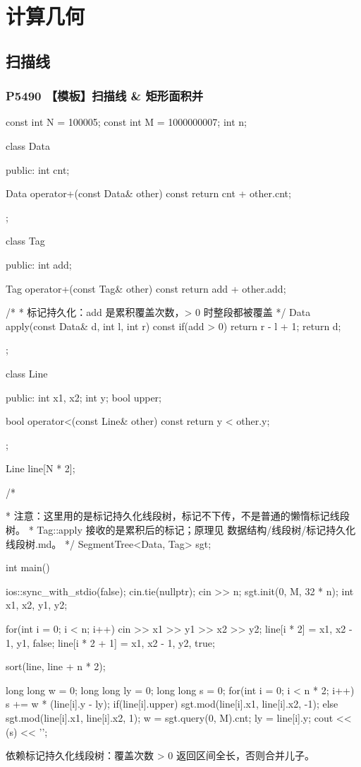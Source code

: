 \chapter{计算几何}

\section{扫描线}
\subsection{P5490 【模板】扫描线 \& 矩形面积并}\label{p5490-ux6a21ux677fux626bux63cfux7ebf-ux77e9ux5f62ux9762ux79efux5e76}


\begin{codeline}
const int N = 100005;
const int M = 1000000007;
int n;

class Data {
public:
    int cnt;

    Data operator+(const Data& other) const {
        return {cnt + other.cnt};
    }
};

class Tag {
public:
    int add;

    Tag operator+(const Tag& other) const {
        return {add + other.add};
    }

    /*
     * 标记持久化：add 是累积覆盖次数，> 0 时整段都被覆盖
     */
    Data apply(const Data& d, int l, int r) const {
        if(add > 0) {
            return {r - l + 1};
        }
        return d;
    }
};

class Line {
public:
    int x1, x2;
    int y;
    bool upper;

    bool operator<(const Line& other) const {
        return y < other.y;
    }
};

Line line[N * 2];

/*
\end{codeline}
\vspace{-0.9\baselineskip}
\begin{codeline}[firstnumber=47]
 * 注意：这里用的是标记持久化线段树，标记不下传，不是普通的懒惰标记线段树。
 * Tag::apply 接收的是累积后的标记；原理见 数据结构/线段树/标记持久化线段树.md。
 */
SegmentTree<Data, Tag> sgt;

int main() {
    ios::sync_with_stdio(false);
    cin.tie(nullptr);
    cin >> n;
    sgt.init(0, M, 32 * n);
    int x1, x2, y1, y2;

    for(int i = 0; i < n; i++) {
        cin >> x1 >> y1 >> x2 >> y2;
        line[i * 2] = {x1, x2 - 1, y1, false};
        line[i * 2 + 1] = {x1, x2 - 1, y2, true};
    }

    sort(line, line + n * 2);

    long long w = 0;
    long long ly = 0;
    long long s = 0;
    for(int i = 0; i < n * 2; i++) {
        s += w * (line[i].y - ly);
        if(line[i].upper) {
            sgt.mod(line[i].x1, line[i].x2, {-1});
        } else {
            sgt.mod(line[i].x1, line[i].x2, {1});
        }
        w = sgt.query(0, M).cnt;
        ly = line[i].y;
    }
    cout << (s) << '\n';
}
\end{codeline}
\begin{warnbox}
依赖标记持久化线段树：覆盖次数 > 0 返回区间全长，否则合并儿子。
\end{warnbox}

